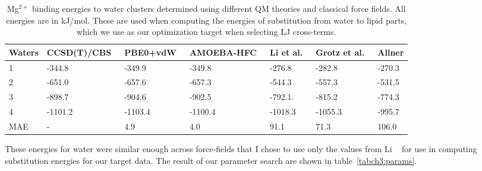 \begin{table}[H]
    \centering
    \tiny
    \begin{tabularx}{\textwidth}{X|X|X|X|X|X|X}
        \hline
        Waters & CCSD(T)/CBS~\cite{wineman:2020:transferable} & PBE0+vdW~\cite{wineman:2020:transferable} & AMOEBA-HFC~\cite{wineman:2020:transferable} & Li et al.~\cite{merzparams} & Grotz et al.~\cite{microparams}  & Allner \etal{} \cite{villaparams}\\
        \hline
             1  &  -344.8  &  -349.9  &  -349.8  &  -276.8  & -282.8   &-270.3\\
             2  &  -651.0  &  -657.6  &  -657.3  &  -544.3  & -557.3   &-531.5\\
             3  &  -898.7  &  -904.6  &  -902.5  &  -792.1. & -815.2   &-774.3\\
             4  & -1101.2  & -1103.4  & -1100.4  & -1018.3 & -1055.3   &-995.7\\
        MAE &     -        &  4.9       &  4.0        &  91.1     &  71.3& 106.0     \\
        \hline
    \end{tabularx}
        \caption[\mg{} binding energies to water]{Mg$^{2+}$ binding energies to water clusters determined using different QM
    theories and classical force fields. All energies are in kJ/mol. These are used when
    computing the energies of substitution from water to lipid parts, which we use
    as our optimization target when selecting LJ cross-terms.}
    \label{tabch3:ionwater}
\end{table}
These energies for water were similar enough across force-fields that I chose to use only the values from Li \etal{}~\cite{merzparams} for use in computing substitution energies for our target data.
The result of our parameter search are shown in table~\ref{tabch3:params}.
